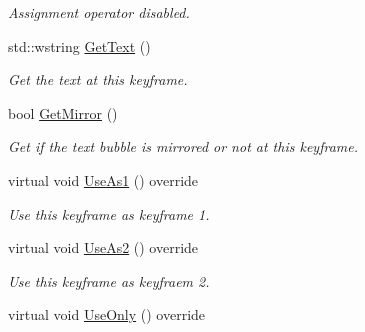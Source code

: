 \begin{DoxyCompactItemize}
\begin{DoxyCompactList}\small\item\em Assignment operator disabled. \end{DoxyCompactList}\item 
std\+::wstring \hyperlink{class_c_anim_channel_text_1_1_keyframe_text_a37c016c705e54ec26408d4ac9e710610}{Get\+Text} ()
\begin{DoxyCompactList}\small\item\em Get the text at this keyframe. \end{DoxyCompactList}\item 
bool \hyperlink{class_c_anim_channel_text_1_1_keyframe_text_a22e197234db7f95ed36f3dcbd0c53fcd}{Get\+Mirror} ()
\begin{DoxyCompactList}\small\item\em Get if the text bubble is mirrored or not at this keyframe. \end{DoxyCompactList}\item 
\hypertarget{class_c_anim_channel_text_1_1_keyframe_text_aafb866f2e2de274f46199fe1be0ec485}{virtual void \hyperlink{class_c_anim_channel_text_1_1_keyframe_text_aafb866f2e2de274f46199fe1be0ec485}{Use\+As1} () override}\label{class_c_anim_channel_text_1_1_keyframe_text_aafb866f2e2de274f46199fe1be0ec485}

\begin{DoxyCompactList}\small\item\em Use this keyframe as keyframe 1. \end{DoxyCompactList}\item 
\hypertarget{class_c_anim_channel_text_1_1_keyframe_text_a26c8a71bab1e9b11e6d80bc25cda7242}{virtual void \hyperlink{class_c_anim_channel_text_1_1_keyframe_text_a26c8a71bab1e9b11e6d80bc25cda7242}{Use\+As2} () override}\label{class_c_anim_channel_text_1_1_keyframe_text_a26c8a71bab1e9b11e6d80bc25cda7242}

\begin{DoxyCompactList}\small\item\em Use this keyframe as keyfraem 2. \end{DoxyCompactList}\item 
\hypertarget{class_c_anim_channel_text_1_1_keyframe_text_a5dd278fa5bc6a275a8efc48ad13405b1}{virtual void \hyperlink{class_c_anim_channel_text_1_1_keyframe_text_a5dd278fa5bc6a275a8efc48ad13405b1}{Use\+Only} () override}\label{class_c_anim_channel_text_1_1_keyframe_text_a5dd278fa5bc6a275a8efc48ad13405b1}


\end{DoxyCompactItemize}
